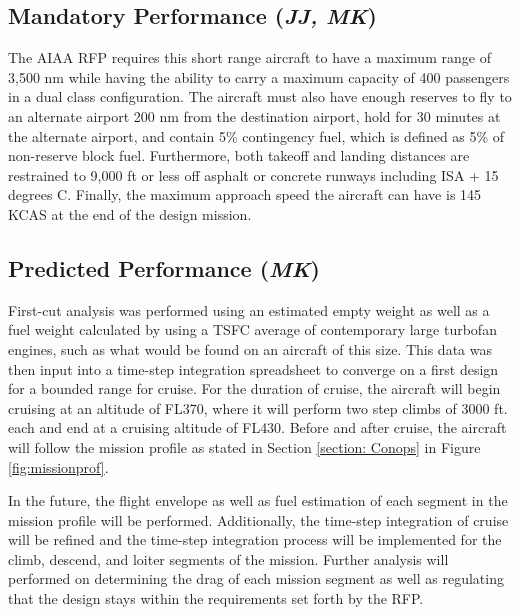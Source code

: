 \subsection{Mandatory Performance (\textit{JJ, MK})}
The AIAA RFP \cite{RFP} requires this short range aircraft to have a maximum range of 3,500 nm while having the ability to carry a maximum capacity of 400 passengers in a dual class configuration. The aircraft must also have enough reserves to fly to an alternate airport 200 nm from the destination airport, hold for 30 minutes at the alternate airport, and contain 5\% contingency fuel, which is defined as 5\% of non-reserve block fuel. Furthermore, both takeoff and landing distances are restrained to 9,000 ft or less off asphalt or concrete runways including ISA + 15 degrees C. Finally, the maximum approach speed the aircraft can have is 145 KCAS at the end of the design mission. 

\subsection{Predicted Performance (\textit{MK})}
First-cut analysis was performed using an estimated empty weight as well as a fuel weight calculated by using a TSFC average of contemporary large turbofan engines, such as what would be found on an aircraft of this size.  This data was then input into a time-step integration spreadsheet to converge on a first design for a bounded range for cruise. For the duration of cruise, the aircraft will begin cruising at an altitude of FL370, where it will perform two step climbs of 3000 ft. each and end at a cruising altitude of FL430. Before and after cruise, the aircraft will follow the mission profile as stated in Section \ref{section: Conops} in Figure \ref{fig:missionprof}.

In the future, the flight envelope as well as fuel estimation of each segment in the mission profile will be performed. Additionally, the time-step integration of cruise will be refined and the time-step integration process will be implemented for the climb, descend, and loiter segments of the mission. Further analysis will performed on determining the drag of each mission segment as well as regulating that the design stays within the requirements set forth by the RFP. 

